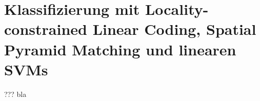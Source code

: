 \section{Klassifizierung mit Locality-constrained Linear Coding, Spatial Pyramid Matching und linearen SVMs}
\begin{frame}[t,fragile]{???}
	bla
\end{frame}